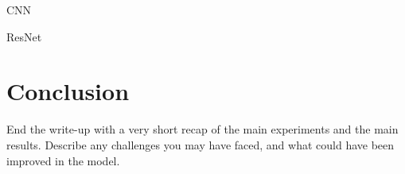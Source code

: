 \documentclass[11pt]{article}
\begin{document}
\begin{subsection}{CNN}

\end{subsection}





\begin{subsection}{ResNet}

\end{subsection}






%
%
%
%
%


\section{Conclusion}

End the write-up with a very short recap of the main experiments and the main results. Describe any challenges you may have faced, and what could have been improved in the model.



\end{document}
